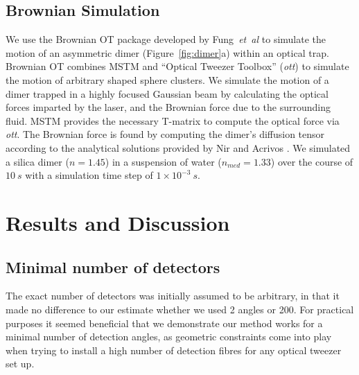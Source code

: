 \documentclass[final,  3p]{elsarticle}
\begin{document}
\subsection{Brownian Simulation}
\label{sec:brownian}

We use the Brownian OT package developed by Fung~\textit{et~al} \cite{Vigilante2020Brownian_OT} to simulate the motion of an asymmetric dimer (Figure~\ref{fig:dimer}a) within an optical trap. Brownian OT combines MSTM \cite{Mishchenko1996MSTM} and ``Optical Tweezer Toolbox'' (\textit{ott}) \cite{Lenton2020} to simulate the motion of arbitrary
shaped sphere clusters. We simulate the motion of a dimer trapped in a highly focused Gaussian beam by calculating the optical forces imparted by the laser, and the Brownian force due to the surrounding fluid. MSTM provides the necessary T-matrix to compute the optical force via \textit{ott}. The Brownian force is found by computing the dimer's diffusion tensor according to the analytical solutions provided by Nir and Acrivos \cite{nir_acrivos_1973}. We simulated a silica dimer ($n = 1.45$) in a suspension of water ($n_{med} = 1.33$) over the course of $10 \ s$ with a simulation time step of $1 \times 10^{-3} \ s$.

\section{Results and  Discussion}
\label{sec:Discussion}
\subsection{Minimal number of detectors}
\label{sec:detectors}
The exact number of detectors was initially assumed to be arbitrary, in that it made no difference to our estimate whether we used 2 angles or 200. For practical purposes it seemed beneficial that we demonstrate our method works for a minimal number of detection angles, as geometric constraints come into play when trying to install a high number of detection fibres for any optical tweezer set up. 
\end{document}
